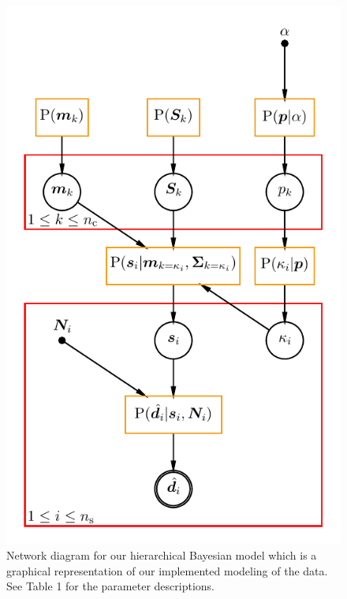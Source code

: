 \documentclass[a4paper,fleqn,usenatbib]{mnras}
\begin{document}
\begin{figure}
	\includegraphics[width=\columnwidth]{bhm_plot.pdf}
    \caption{Network diagram for our hierarchical Bayesian model which is a graphical representation of our implemented modeling of the data. See Table 1 for the parameter descriptions.}
    \label{fig:network_diagram}
\end{figure}
\end{document}
